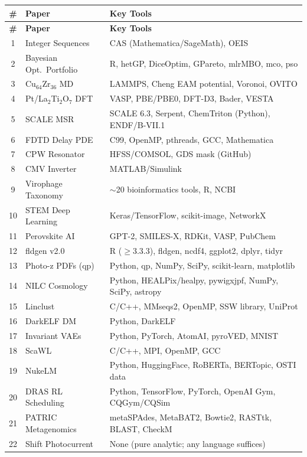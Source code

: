 \documentclass[11pt,letterpaper]{article}
\begin{document}
\small
\begin{longtable}{c p{3cm} p{9cm}}
\toprule
\textbf{\#} & \textbf{Paper} & \textbf{Key Tools} \\
\midrule
\endfirsthead
\toprule
\textbf{\#} & \textbf{Paper} & \textbf{Key Tools} \\
\midrule
\endhead
1  & Integer Sequences & CAS (Mathematica/SageMath), OEIS \\
2  & Bayesian Opt.\ Portfolio & R, hetGP, DiceOptim, GPareto, mlrMBO, mco, pso \\
3  & Cu$_{64}$Zr$_{36}$ MD & LAMMPS, Cheng EAM potential, Voronoi, OVITO \\
4  & Pt/La$_2$Ti$_2$O$_7$ DFT & VASP, PBE/PBE0, DFT-D3, Bader, VESTA \\
5  & SCALE MSR & SCALE 6.3, Serpent, ChemTriton (Python), ENDF/B-VII.1 \\
6  & FDTD Delay PDE & C99, OpenMP, pthreads, GCC, Mathematica \\
7  & CPW Resonator & HFSS/COMSOL, GDS mask (GitHub) \\
8  & CMV Inverter & MATLAB/Simulink \\
9  & Virophage Taxonomy & $\sim$20 bioinformatics tools, R, NCBI \\
10 & STEM Deep Learning & Keras/TensorFlow, scikit-image, NetworkX \\
11 & Perovskite AI & GPT-2, SMILES-X, RDKit, VASP, PubChem \\
\midrule
12 & fldgen v2.0 & R ($\geq$3.3.3), fldgen, ncdf4, ggplot2, dplyr, tidyr \\
13 & Photo-z PDFs (qp) & Python, qp, NumPy, SciPy, scikit-learn, matplotlib \\
14 & NILC Cosmology & Python, HEALPix/healpy, pywigxjpf, NumPy, SciPy, astropy \\
15 & Linclust & C/C++, MMseqs2, OpenMP, SSW library, UniProt \\
16 & DarkELF DM & Python, DarkELF \\
17 & Invariant VAEs & Python, PyTorch, AtomAI, pyroVED, MNIST \\
18 & ScaWL & C/C++, MPI, OpenMP, GCC \\
19 & NukeLM & Python, HuggingFace, RoBERTa, BERTopic, OSTI data \\
20 & DRAS RL Scheduling & Python, TensorFlow, PyTorch, OpenAI Gym, CQGym/CQSim \\
21 & PATRIC Metagenomics & metaSPAdes, MetaBAT2, Bowtie2, RASTtk, BLAST, CheckM \\
22 & Shift Photocurrent & None (pure analytic; any language suffices) \\

\end{longtable}
\end{document}
